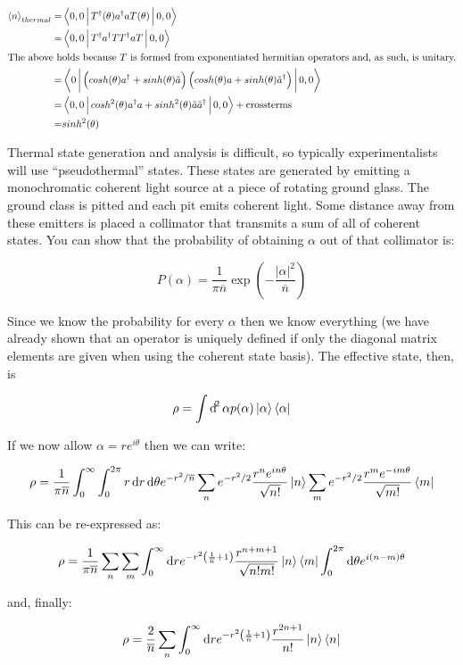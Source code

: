 \documentclass{article}
\begin{document}
\begin{align*}
   \Braket{n}_{thermal} =& \Braket{0,0 | T^\dagger(\theta) a^\dagger a T(\theta)
   | 0,0} \\
   =& \Braket{0,0| T^\dagger a^\dagger T T^\dagger a T | 0,0} \\
   \intertext{The above holds because $T$ is formed from exponentiated hermitian
   operators and, as such, is unitary.}
   =& \Braket{0 | \left( cosh(\theta) a^\dagger + sinh(\theta) \tilde{a} \right)
   \left( cosh(\theta)a + sinh(\theta) \tilde{a}^\dagger \right) | 0,0}\\
   =& \Braket{0,0| cosh^2(\theta) a^\dagger a + sinh^2(\theta) \tilde{a}
   \tilde{a}^\dagger| 0,0} + \text{crossterms}\\
   =& sinh^2(\theta)
\end{align*}

Thermal state generation and analysis is difficult, so typically
experimentalists will use ``pseudothermal'' states. These states are generated
by emitting a monochromatic coherent light source at a piece of rotating ground
glass. The ground class is pitted and each pit emits coherent light. Some
distance away from these emitters is placed a collimator that transmits a sum of
all of coherent states. You can show that the probability of obtaining $\alpha$
out of that collimator is:

\[
   P(\alpha) = \frac{1}{\pi \overline{n}} \exp(-\frac{\left| \alpha
   \right|^2}{\overline{n}})
\]

Since we know the probability for every $ \alpha $ then we know everything (we
have already shown that an operator is uniquely defined if only the diagonal
matrix elements are given when using the coherent state basis). The effective
state, then, is

\[
   \rho = \int \dif^2 \alpha p(\alpha) \Ket{\alpha}\Bra{\alpha}
\]

If we now allow $ \alpha = r e^{i \theta} $ then we can write:

\[
   \rho = \frac{1}{\pi \overline{n}} \int_0^\infty \int_0^{2\pi} r \dif r \dif
   \theta e^{-r^2/\overline{n}}\sum_n e^{-r^2/2}\frac{r^n e^{i n \theta}
   }{\sqrt{n!}}\Ket{n} \sum_m e^{-r^2/2} \frac{r^m e^{-i m \theta} }{\sqrt{m!}} \Bra{m}  
\]

This can be re-expressed as:

\[
   \rho = \frac{1}{\pi \overline{n}} \sum_n \sum_m \int_0^\infty \dif r e^{-r^2 \left(
   \frac{1}{\overline{n}} +1 \right)}
   \frac{r^{n+m+1}}{\sqrt{n!m!}}\Ket{n}\Bra{m} \int_0^{2\pi} \dif \theta e^{i
   \left( n-m \right)\theta}  
\]

and, finally:

\[
   \rho = \frac{2}{\overline{n}} \sum_n \int_0^\infty \dif r e^{-r^2 \left(
   \frac{1}{\overline{n}} + 1 \right)} \frac{r^{2n+1}}{n!} \Ket{n}\Bra{n}
\]
\end{document}

